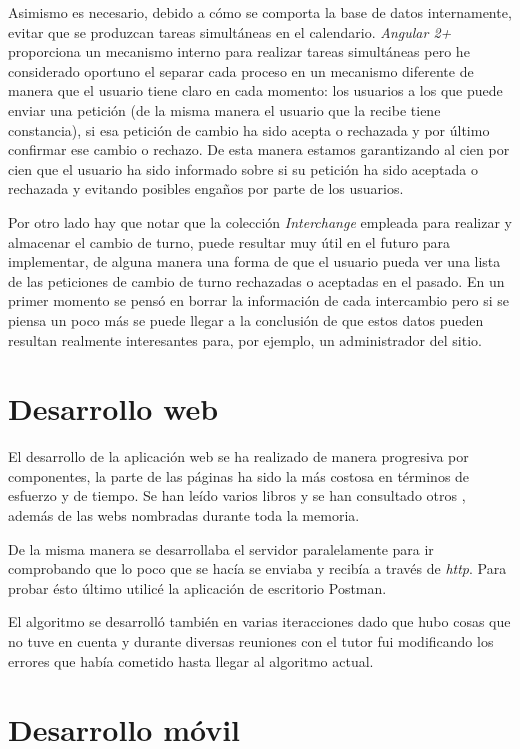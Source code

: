  Asimismo es necesario, debido a cómo se comporta la base de datos internamente, evitar que se produzcan tareas simultáneas en el calendario. \emph{Angular 2+} proporciona un mecanismo interno para realizar tareas simultáneas pero he considerado oportuno el separar cada proceso en un mecanismo diferente de manera que el usuario tiene claro en cada momento: los usuarios a los que puede enviar una petición (de la misma manera el usuario que la recibe tiene constancia), si esa petición de cambio ha sido acepta o rechazada y por último confirmar ese cambio o rechazo. De esta manera estamos garantizando al cien por cien que el usuario ha sido informado sobre si su petición ha sido aceptada o rechazada y evitando posibles engaños por parte de los usuarios.
 
 Por otro lado hay que notar que la colección \emph{Interchange} empleada para realizar y almacenar el cambio de turno, puede resultar muy útil en el futuro para implementar, de alguna manera una forma de que el usuario pueda ver una lista de las peticiones de cambio de turno rechazadas o aceptadas en el pasado. En un primer momento se pensó en borrar la información de cada intercambio pero si se piensa un poco más se puede llegar a la conclusión de que estos datos pueden resultan realmente interesantes para, por ejemplo, un administrador del sitio. 
 

   
   \section{Desarrollo web}\label{dweb}
   
   El desarrollo de la aplicación web se ha realizado de manera progresiva por componentes, la parte de las páginas ha sido la más costosa en términos de esfuerzo y de tiempo. Se han  leído varios libros  \cite{librohtml, cleancode} y se han consultado otros \citep{librosconsulta}, además de las webs nombradas durante toda la memoria.
   
  De la misma manera se desarrollaba el servidor paralelamente para ir comprobando que lo poco que se hacía se enviaba y recibía a través de \emph{http}. Para probar ésto último utilicé la aplicación de escritorio Postman. 
  
  El algoritmo se desarrolló también en varias iteracciones dado que hubo cosas que no tuve en cuenta y durante diversas reuniones con el tutor fui modificando los errores que había cometido hasta llegar al algoritmo actual.
   \section{Desarrollo móvil}\label{dapp}
   
